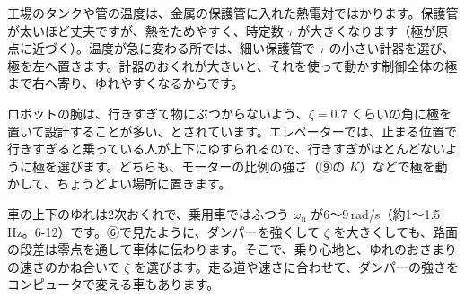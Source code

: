 \begin{butsuri}
\noindent\begin{minipage}[c]{0.7\linewidth}
\raggedright
工場のタンクや管の温度は、金属の保護管に入れた熱電対ではかります。保護管が太いほど丈夫ですが、熱をためやすく、時定数 $\tau$ が大きくなります（極が原点に近づく）。温度が急に変わる所では、細い保護管で $\tau$ の小さい計器を選び、極を左へ置きます。計器のおくれが大きいと、それを使って動かす制御全体の極まで右へ寄り、ゆれやすくなるからです。
\end{minipage}\hfill
\begin{minipage}[c]{0.27\linewidth}
\centering
{}
\end{minipage}\par\vspace{4pt}

ロボットの腕は、行きすぎて物にぶつからないよう、$\zeta=0.7$ くらいの角に極を置いて設計することが多い、とされています。エレベーターでは、止まる位置で行きすぎると乗っている人が上下にゆすられるので、行きすぎがほとんどないように極を選びます。どちらも、モーターの比例の強さ（⑨の $K$）などで極を動かして、ちょうどよい場所に置きます。
\par\vspace{4pt}
車の上下のゆれは2次おくれで、乗用車ではふつう $\omega_{\mathrm n}$ が6〜9\,rad/s（約1〜1.5\,Hz。6-12）です。⑥で見たように、ダンパーを強くして $\zeta$ を大きくしても、路面の段差は零点を通して車体に伝わります。そこで、乗り心地と、ゆれのおさまりの速さのかね合いで $\zeta$ を選びます。走る道や速さに合わせて、ダンパーの強さをコンピュータで変える車もあります。
\end{butsuri}


